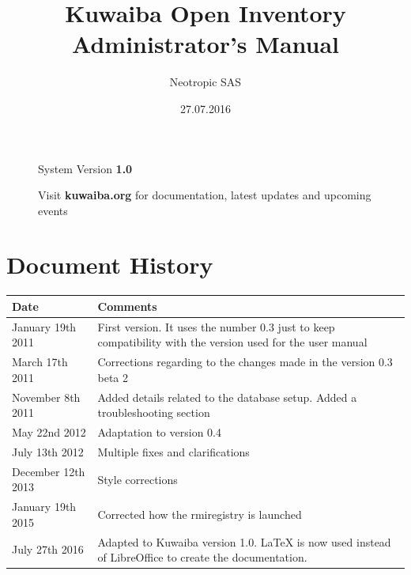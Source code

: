 \documentclass[a4paper]{article}
\title{Kuwaiba Open Inventory Administrator's Manual}
\author{Neotropic SAS}
\date{27.07.2016}
\begin{document}
	\maketitle
	
	
	
	\begin{figure}[b]
		\centering System Version \textbf{1.0}
			
		Visit \textbf{kuwaiba.org} for documentation, latest updates and upcoming events
	\end{figure}
	
	
	\newpage
	
	\tableofcontents

	\newpage
	\section{Document History}
		\begin{table}[h!]
			\centering
			\begin{tabular}{l||p{10cm}} %
				\toprule
				\textbf{Date} & \textbf{Comments}  \\
				\midrule
				January 19th 2011 & First version. It uses the number 0.3 just to keep compatibility with the version used for the user manual\\
				\midrule
				March 17th 2011 & Corrections regarding to the changes made in the version 0.3 beta 2 \\
				\midrule
				November 8th  2011 & Added details related to the database setup. Added a troubleshooting section \\
				\midrule
				May 22nd 2012 & Adaptation to version 0.4 \\
				\midrule
				July 13th 2012 & Multiple fixes and clarifications \\
				\midrule
				December 12th 2013 & Style corrections \\
				\midrule
				January 19th 2015 & Corrected how the rmiregistry is launched \\
				\midrule
				July 27th 2016 & Adapted to Kuwaiba version 1.0. LaTeX is now used instead of LibreOffice to create the documentation. \\
				\bottomrule
			\end{tabular}	
				
		\end{table}
	\newpage
\end{document}
